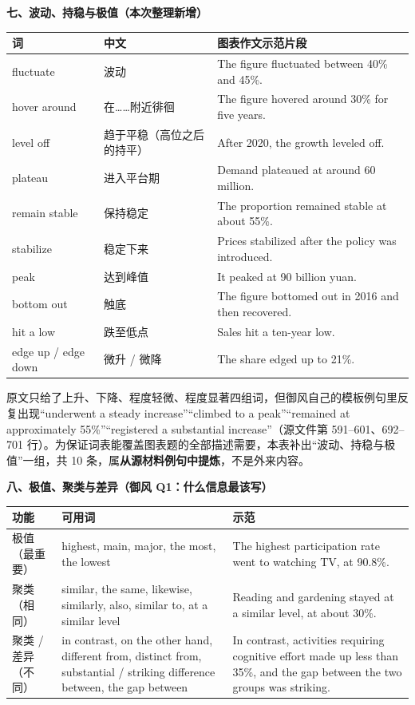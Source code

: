 \documentclass[11pt,a4paper]{ctexart}
\newcommand{\impr}[1]{\par\addvspace{3pt}\noindent{\bfseries【本次改进】}#1\par\addvspace{3pt}}
\begin{document}
\par\addvspace{5pt}\noindent\textbf{七、波动、持稳与极值（本次整理新增）}\par\addvspace{2pt}
\begin{longtable}{L{2.9cm}L{1.9cm}L{10.9cm}}
\toprule
\textbf{词} & \textbf{中文} & \textbf{图表作文示范片段} \\
\midrule
\endhead
fluctuate & 波动 & The figure fluctuated between 40\% and 45\%. \\
hover around & 在……附近徘徊 & The figure hovered around 30\% for five years. \\
level off & 趋于平稳（高位之后的持平） & After 2020, the growth leveled off. \\
plateau & 进入平台期 & Demand plateaued at around 60 million. \\
remain stable & 保持稳定 & The proportion remained stable at about 55\%. \\
stabilize & 稳定下来 & Prices stabilized after the policy was introduced. \\
peak & 达到峰值 & It peaked at 90 billion yuan. \\
bottom out & 触底 & The figure bottomed out in 2016 and then recovered. \\
hit a low & 跌至低点 & Sales hit a ten-year low. \\
edge up / edge down & 微升 / 微降 & The share edged up to 21\%. \\
\bottomrule
\end{longtable}

\impr{原文只给了上升、下降、程度轻微、程度显著四组词，但御风自己的模板例句里反复出现“underwent a steady increase”“climbed to a peak”“remained at approximately 55\%”“registered a substantial increase”（源文件第 591--601、692--701 行）。为保证词表能覆盖图表题的全部描述需要，本表补出“波动、持稳与极值”一组，共 10 条，属\textbf{从源材料例句中提炼}，不是外来内容。}

\par\addvspace{5pt}\noindent\textbf{八、极值、聚类与差异（御风 Q1：什么信息最该写）}\par\addvspace{2pt}
\begin{longtable}{L{3.6cm}L{6.6cm}L{5.5cm}}
\toprule
\textbf{功能} & \textbf{可用词} & \textbf{示范} \\
\midrule
\endhead
极值（最重要） & highest, main, major, the most, the lowest & The highest participation rate went to watching TV, at 90.8\%. \\
聚类（相同） & similar, the same, likewise, similarly, also, similar to, at a similar level & Reading and gardening stayed at a similar level, at about 30\%. \\
聚类 / 差异（不同） & in contrast, on the other hand, different from, distinct from, substantial / striking difference between, the gap between & In contrast, activities requiring cognitive effort made up less than 35\%, and the gap between the two groups was striking. \\
\bottomrule
\end{longtable}
\end{document}
